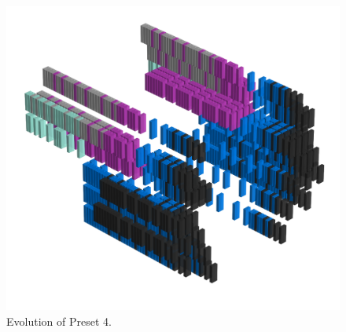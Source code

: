 \clearpage                                                                 
\begin{figure}[H]                                                          
  \centering                                                             
  \begin{adjustbox}{width=14cm,center}                                   
  \includegraphics[width=14cm]{src/presets/pattern4-45.png}%
  \end{adjustbox}                                                        
\caption{Evolution of Preset 4.}                                           
\end{figure}                                                               
\clearpage                                                                 
                                                                           
